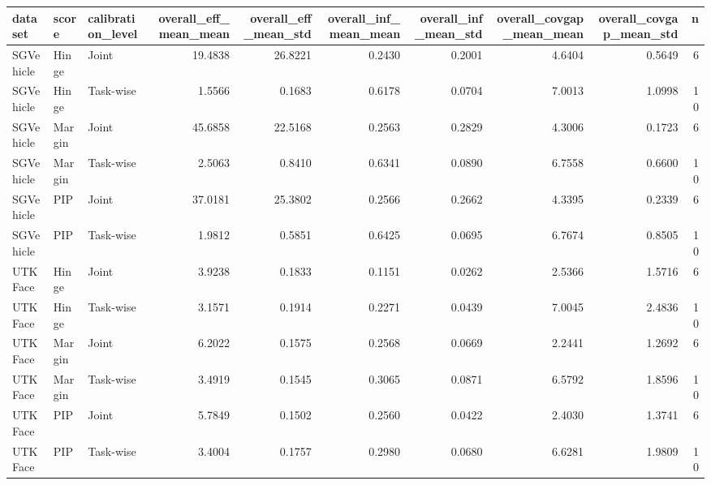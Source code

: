 \begin{tabular}{lllrrrrrrr}
\toprule
dataset & score & calibration_level & overall_eff_mean_mean & overall_eff_mean_std & overall_inf_mean_mean & overall_inf_mean_std & overall_covgap_mean_mean & overall_covgap_mean_std & n \\
\midrule
SGVehicle & Hinge & Joint & 19.4838 & 26.8221 & 0.2430 & 0.2001 & 4.6404 & 0.5649 & 6 \\
SGVehicle & Hinge & Task-wise & 1.5566 & 0.1683 & 0.6178 & 0.0704 & 7.0013 & 1.0998 & 10 \\
SGVehicle & Margin & Joint & 45.6858 & 22.5168 & 0.2563 & 0.2829 & 4.3006 & 0.1723 & 6 \\
SGVehicle & Margin & Task-wise & 2.5063 & 0.8410 & 0.6341 & 0.0890 & 6.7558 & 0.6600 & 10 \\
SGVehicle & PIP & Joint & 37.0181 & 25.3802 & 0.2566 & 0.2662 & 4.3395 & 0.2339 & 6 \\
SGVehicle & PIP & Task-wise & 1.9812 & 0.5851 & 0.6425 & 0.0695 & 6.7674 & 0.8505 & 10 \\
UTKFace & Hinge & Joint & 3.9238 & 0.1833 & 0.1151 & 0.0262 & 2.5366 & 1.5716 & 6 \\
UTKFace & Hinge & Task-wise & 3.1571 & 0.1914 & 0.2271 & 0.0439 & 7.0045 & 2.4836 & 10 \\
UTKFace & Margin & Joint & 6.2022 & 0.1575 & 0.2568 & 0.0669 & 2.2441 & 1.2692 & 6 \\
UTKFace & Margin & Task-wise & 3.4919 & 0.1545 & 0.3065 & 0.0871 & 6.5792 & 1.8596 & 10 \\
UTKFace & PIP & Joint & 5.7849 & 0.1502 & 0.2560 & 0.0422 & 2.4030 & 1.3741 & 6 \\
UTKFace & PIP & Task-wise & 3.4004 & 0.1757 & 0.2980 & 0.0680 & 6.6281 & 1.9809 & 10 \\
\bottomrule
\end{tabular}
